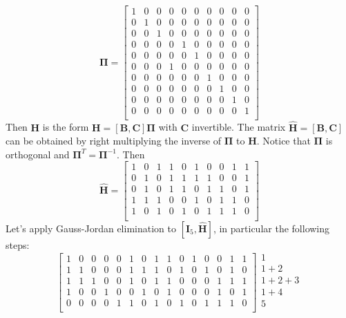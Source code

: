 \documentclass[10pt]{article}
\begin{document}
\begin{equation}
	\mathbf{\Pi} = 
	\begin{bmatrix}
		1&0&0&0&0&0&0&0&0&0\\
		0&1&0&0&0&0&0&0&0&0\\
		0&0&1&0&0&0&0&0&0&0\\
		0&0&0&0&1&0&0&0&0&0\\
		0&0&0&0&0&1&0&0&0&0\\
		0&0&0&1&0&0&0&0&0&0\\
		0&0&0&0&0&0&1&0&0&0\\
		0&0&0&0&0&0&0&1&0&0\\
		0&0&0&0&0&0&0&0&1&0\\
		0&0&0&0&0&0&0&0&0&1\\
	\end{bmatrix}
\end{equation}
Then $\mathbf{H}$ is the form $\mathbf{H} = [\mathbf{B}, \mathbf{C}]\mathbf{\Pi}$ with $\mathbf{C}$ invertible. The matrix $\mathbf{\hat{H}} = [\mathbf{B}, \mathbf{C}]$ can be obtained by right multiplying the inverse of $\mathbf{\Pi}$ to $\mathbf{H}$. Notice that $\mathbf{\Pi}$ is orthogonal and $\mathbf{\Pi}^T = \mathbf{\Pi}^{-1}$. Then 
\begin{equation}
\mathbf{\hat{H}} =
	\begin{bmatrix}
		1&0&1&1&0&1&0&0&1&1\\
		0&1&0&1&1&1&1&0&0&1\\
		0&1&0&1&1&0&1&1&0&1\\
		1&1&1&0&0&1&0&1&1&0\\
		1&0&1&0&1&0&1&1&1&0\\
	\end{bmatrix}
\end{equation}
Let's apply Gauss-Jordan elimination to $[\mathbf{I}_5, \mathbf{\hat{H}}]$, in particular the following steps:
\begin{equation}
	\left[
	\begin{array}{ccccccccccccccc}
		1&0&0&0&0&1&0&1&1&0&1&0&0&1&1\\
		1&1&0&0&0&1&1&1&0&1&0&1&0&1&0\\
		1&1&1&0&0&1&0&1&1&0&0&0&1&1&1\\
		1&0&0&1&0&0&1&0&1&0&0&0&1&0&1\\
		0&0&0&0&1&1&0&1&0&1&0&1&1&1&0\\
	\end{array}
	\right]
	\begin{array}{l}
		1 \\
		1 + 2 \\
		1 + 2 + 3 \\
		1 + 4 \\
		5 \\
	\end{array}
\end{equation}
\end{document}

